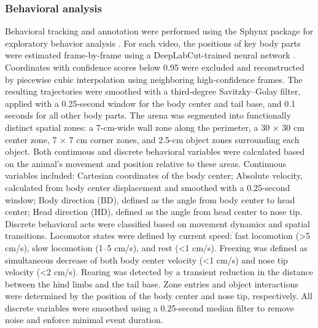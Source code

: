 \subsubsection{Behavioral analysis}
\label{sec:behavioral_analysis}
Behavioral tracking and annotation were performed using the Sphynx package for exploratory behavior analysis \cite{Plusnin1}. For each video, the positions of key body parts were estimated frame-by-frame using a DeepLabCut-trained neural network \cite{Mathis}. Coordinates with confidence scores below 0.95 were excluded and reconstructed by piecewise cubic interpolation using neighboring high-confidence frames. The resulting trajectories were smoothed with a third-degree Savitzky--Golay filter, applied with a 0.25-second window for the body center and tail base, and 0.1 seconds for all other body parts. The arena was segmented into functionally distinct spatial zones: a 7-cm-wide wall zone along the perimeter, a 30 × 30 cm center zone, 7 × 7 cm corner zones, and 2.5-cm object zones surrounding each object. Both continuous and discrete behavioral variables were calculated based on the animal's movement and position relative to these areas. Continuous variables included:
Cartesian coordinates of the body center;
Absolute velocity, calculated from body center displacement and smoothed with a 0.25-second window;
Body direction (BD), defined as the angle from body center to head center;
Head direction (HD), defined as the angle from head center to nose tip.
Discrete behavioral acts were classified based on movement dynamics and spatial transitions. Locomotor states were defined by current speed: fast locomotion (>5 cm/s), slow locomotion (1--5 cm/s), and rest (<1 cm/s). Freezing was defined as simultaneous decrease of both body center velocity (<1 cm/s) and nose tip velocity
(<2 cm/s). Rearing was detected by a transient reduction in the distance between the
hind limbs and the tail base. Zone entries and object interactions were determined
by the position of the body center and nose tip, respectively. All discrete
variables were smoothed using a 0.25-second median filter to remove noise and
enforce minimal event duration.


